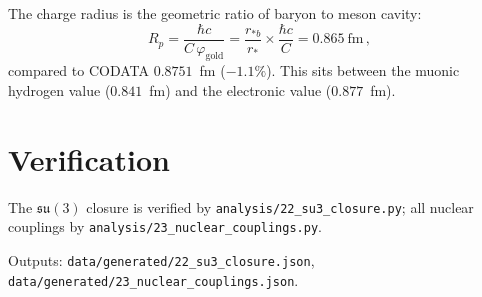 \documentclass[11pt,letterpaper]{article}
\numberwithin{equation}{section}
\begin{document}
The charge radius is the geometric ratio of baryon to meson cavity:
\begin{equation}\label{eq:rp}
  R_p = \frac{\hbar c}{C\,\varphi_\mathrm{gold}}
  = \frac{r_{*b}}{r_*} \times \frac{\hbar c}{C}
  = 0.865~\text{fm}\,,
\end{equation}
compared to CODATA $0.8751$~fm ($-1.1\%$).  This sits between the
muonic hydrogen value ($0.841$~fm) and the electronic value
($0.877$~fm).

\section{Verification}

The $\mathfrak{su}(3)$ closure is verified by
\texttt{analysis/22\_su3\_closure.py}; all nuclear couplings by
\texttt{analysis/23\_nuclear\_couplings.py}.

Outputs: \texttt{data/generated/22\_su3\_closure.json},
\texttt{data/generated/23\_nuclear\_couplings.json}.
\end{document}
